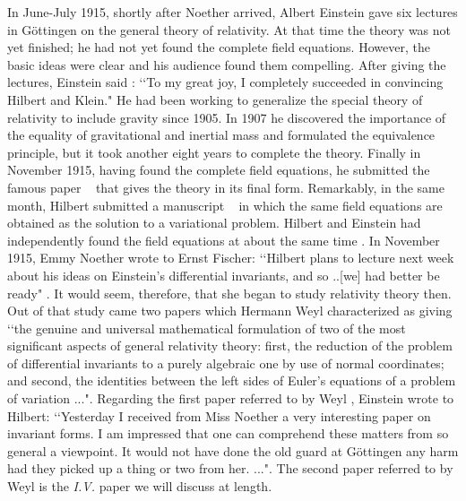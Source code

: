\documentclass[12pt]{article}
\begin{document}
In June-July 1915,
shortly after Noether arrived,  Albert Einstein gave  six 
lectures in G\"{o}ttingen on the general  theory of relativity.   At that time the theory  was
not yet finished; he had not yet found the complete field equations. However,
the basic ideas were clear and his audience found them  compelling.  
After giving the lectures, Einstein said \cite{pais}: \lq\lq To my great joy, I completely 
succeeded in convincing Hilbert and Klein." He had been working to generalize
the special theory of relativity to include gravity since 1905. In 1907 he
discovered the importance  of the equality of gravitational and inertial mass
and formulated the equivalence principle, but it took another eight years  to
complete the theory.  Finally in November 1915, having found the complete field
equations, he submitted   the famous paper \cite{einstein} ~ that gives the theory
in its final form. Remarkably, in the same month,  Hilbert
submitted a manuscript \cite{hilbert} ~ in which the same field  equations are
obtained as the solution to a variational problem. Hilbert and
Einstein  had independently found the field equations at about the same
time \cite{pais}.  
In  November 1915, Emmy Noether  wrote to Ernst Fischer:
\lq\lq Hilbert plans to lecture next week about his ideas on Einstein's
differential invariants, and so ..[we] had better be ready" \cite{Dick}.  It would
seem, therefore, that she 
 began to study relativity theory then.  Out of that
study came two papers which Hermann Weyl characterized as giving \lq\lq the
genuine and universal mathematical formulation of two of  the most significant
aspects of general relativity theory: first, the reduction of the problem of
differential invariants to a purely algebraic one by use of normal coordinates;
and second, the identities between the left sides of Euler's equations of a
problem of variation ..."\cite{weyl}.  Regarding the first paper 
referred to by Weyl 
\cite{paper1}, Einstein wrote to Hilbert: \lq\lq Yesterday I  received from Miss
Noether a very interesting paper on invariant forms. I am impressed that one
can comprehend these matters from so general a viewpoint. It would not have
done the old guard at G\"{o}ttingen any harm had they picked up a thing or two
from her. ..."\cite{kimb}. The second paper referred to by Weyl
  is the {\it{I.V.}} paper we will discuss at length.
\end{document}

